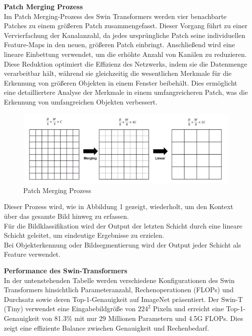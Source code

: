 \documentclass[12pt,a4paper,twoside]{article}
\begin{document}
\textbf{Patch Merging Prozess}\\
Im Patch Merging-Prozess des Swin Transformers werden vier benachbarte Patches zu einem größeren Patch zusammengefasst. Dieser Vorgang führt zu einer Vervierfachung der Kanalanzahl, da jedes ursprüngliche Patch seine individuellen Feature-Maps in den neuen, größeren Patch einbringt. Anschließend wird eine lineare Einbettung verwendet, um die erhöhte Anzahl von Kanälen zu reduzieren. Diese Reduktion optimiert die Effizienz des Netzwerks, indem sie die Datenmenge verarbeitbar hält, während sie gleichzeitig die wesentlichen Merkmale für die Erkennung von größeren Objekten in einem Fenster beibehält. Dies ermöglicht eine detailliertere Analyse der Merkmale in einem umfangreicheren Patch, was die Erkennung von umfangreichen Objekten verbessert.




\begin{figure}[H]
    \centering
    \includegraphics[width=0.7\linewidth]{SWIN-Transformer-PatchMerging.png}
    \caption{Patch Merging Prozess}
    \label{fig:patch_merging}
\end{figure}

Dieser Prozess wird, wie in Abbildung 1 gezeigt, wiederholt, um den Kontext über das gesamte Bild hinweg zu erfassen.\\
Für die Bildklassifikation wird der Output der letzten Schicht durch eine lineare Schicht geleitet, um eindeutige Ergebnisse zu erzielen. \\
Bei Objekterkennung oder Bildsegmentierung wird der Output jeder Schicht als Feature verwendet.

\textbf{Performance des Swin-Transformers}\\
In der untenstehenden Tabelle werden verschiedene Konfigurationen des Swin Transformers hinsichtlich Parameteranzahl, Rechenoperationen (FLOPs) und Durchsatz sowie deren Top-1-Genauigkeit auf ImageNet präsentiert. Der Swin-T (Tiny) verwendet eine Eingabebildgröße von \(224^2\) Pixeln und erreicht eine Top-1-Genauigkeit von 81.3\% mit nur 29 Millionen Parametern und 4.5G FLOPs. Dies zeigt eine effiziente Balance zwischen Genauigkeit und Rechenbedarf.
\end{document}
